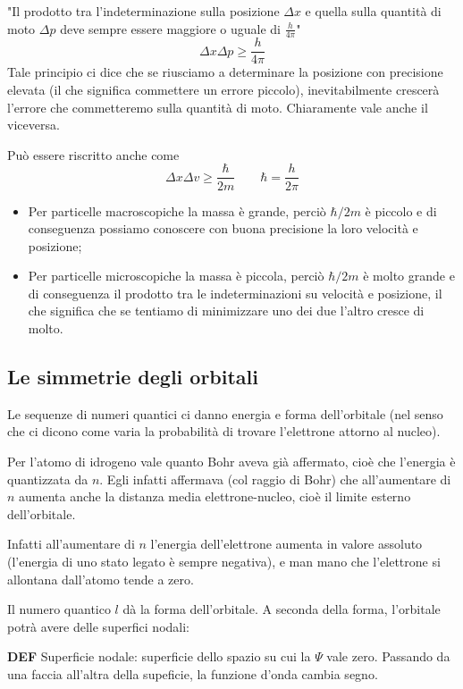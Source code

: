 "Il prodotto tra l'indeterminazione sulla posizione $\Delta x$ e quella sulla quantità di moto $\Delta p$ deve sempre essere maggiore o uguale di $\frac{h}{4 \pi}$"
$$\Delta x \Delta p \geq \frac{h}{4\pi}$$
Tale principio ci dice che se riusciamo a determinare la posizione con precisione elevata (il che significa commettere un errore piccolo), inevitabilmente crescerà l'errore che commetteremo sulla quantità di moto. Chiaramente vale anche il viceversa.

Può essere riscritto anche come
$$\Delta x \Delta v \geq \frac{\hbar}{2m} \qquad \hbar=\frac{h}{2\pi}$$
\begin{itemize}
  \item Per particelle macroscopiche la massa è grande, perciò $\hbar/2m$ è piccolo e di conseguenza possiamo conoscere con buona precisione la loro velocità e posizione;
  \item Per particelle microscopiche la massa è piccola, perciò $\hbar/2m$ è molto grande e di conseguenza il prodotto tra le indeterminazioni su velocità e posizione, il che significa che se tentiamo di minimizzare uno dei due l'altro cresce di molto.
\end{itemize}

\subsection{Le simmetrie degli orbitali}
Le sequenze di numeri quantici ci danno energia e forma dell'orbitale (nel senso che ci dicono come varia la probabilità di trovare l'elettrone attorno al nucleo).

Per l'atomo di idrogeno vale quanto Bohr aveva già affermato, cioè che l'energia è quantizzata da $n$. Egli infatti affermava (col raggio di Bohr) che all'aumentare di $n$ aumenta anche la distanza media elettrone-nucleo, cioè il limite esterno dell'orbitale.

Infatti all'aumentare di $n$ l'energia dell'elettrone aumenta in valore assoluto (l'energia di uno stato legato è sempre negativa), e man mano che l'elettrone si allontana dall'atomo tende a zero.

\vspace{0.2cm}Il numero quantico $l$ dà la forma dell'orbitale. A seconda della forma, l'orbitale potrà avere delle superfici nodali:

\vspace{0.2cm}\textbf{DEF} Superficie nodale: superficie dello spazio su cui la $\Psi$ vale zero. Passando da una faccia all'altra della supeficie, la funzione d'onda cambia segno.

